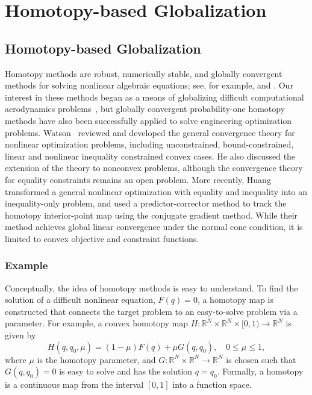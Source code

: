  
\chapter{Homotopy-based Globalization}

\section{Homotopy-based Globalization}\label{sec:homotopy}
Homotopy methods are robust, numerically stable, and globally convergent methods
for solving nonlinear algebraic equations; see, for example,
\cite{allgower_georg_1993} and \cite{Watson_1989}.  Our interest in these
methods began as a means of globalizing difficult computational aerodynamics
problems~\cite{hicken:cfd2009, hicken:cfd2011b, Brown_2016}, but globally
convergent probability-one homotopy methods have also been successfully applied
to solve engineering optimization problems.  Watson~\cite{Watson_2001} reviewed
and developed the general convergence theory for nonlinear optimization
problems, including unconstrained, bound-constrained, linear and nonlinear
inequality constrained convex cases.  He also discussed the extension of the
theory to nonconvex problems, although the convergence theory for equality
constraints remains an open problem.  More recently, Huang
\etal~\cite{huang_2012pc} transformed a general nonlinear optimization with
equality and inequality into an inequality-only problem, and used a
predictor-corrector method to track the homotopy interior-point map using the
conjugate gradient method. While their method achieves global linear convergence
under the normal cone condition, it is limited to convex objective and
constraint functions.

\subsection{Example}

Conceptually, the idea of homotopy methods is easy to understand. To find the
solution of a difficult nonlinear equation, $F(q)=0$, a homotopy map is
constructed that connects the target problem to an easy-to-solve problem via a
parameter.  For example, a convex homotopy map $H : \mathbb{R}^N \times
\mathbb{R}^{N} \times [0,1) \rightarrow \mathbb{R}^N$ is given by
\begin{equation}\label{eq:homotopy}
H(q, q_0, \mu) = (1-\mu) F(q) + \mu G(q,q_0),\quad 0 \leq \mu \leq 1,
\end{equation}
where $\mu$ is the homotopy parameter, and $G : \mathbb{R}^N\times\mathbb{R}^{N}
\rightarrow \mathbb{R}^N$ is chosen such that $G(q,q_0)=0$ is easy to solve and
has the solution $q=q_0$.  Formally, a homotopy is a continuous map from the
interval $[0,1]$ into a function space.

